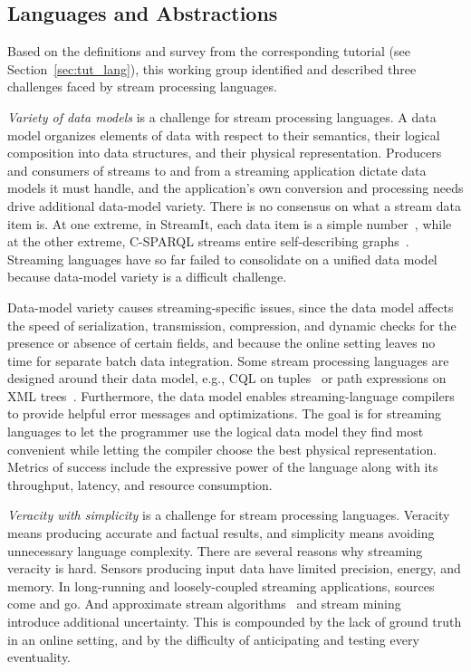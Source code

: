 \subsection{Languages and Abstractions}\label{sec:wg_lang}

Based on the definitions and survey from the corresponding tutorial
(see Section~\ref{sec:tut_lang}), this working group identified and
described three challenges faced by stream processing languages.

\emph{Variety of data models} is a challenge for stream processing
languages. A data model organizes elements of data with respect to
their semantics, their logical composition into data structures, and
their physical representation. Producers and consumers of streams to
and from a streaming application dictate data models it must handle,
and the application's own conversion and processing needs drive
additional data-model variety.  There is no consensus on what a stream
data item is. At one extreme, in \textsf{StreamIt}, each data item is a simple
number~\cite{thies_et_al_2002}, while at the other extreme, \textsf{C-SPARQL}
streams entire self-describing graphs~\cite{barbieri_et_al_2009}.
Streaming languages have so far failed to consolidate on a unified data model
because data-model variety is a difficult challenge.

Data-model variety causes streaming-specific issues, since the data
model affects the speed of serialization, transmission, compression,
and dynamic checks for the presence or absence of certain fields, and
because the online setting leaves no time for separate batch data
integration. Some stream processing languages are designed around
their data model, e.g., CQL on tuples~\cite{arasu_babu_widom_2006} or
path expressions on XML trees~\cite{diao_et_al_2002}. Furthermore, the
data model enables streaming-language compilers to provide helpful
error messages and optimizations. The goal is for streaming languages to let the programmer use the
logical data model they find most convenient while letting the
compiler choose the best physical representation. Metrics of success
include the expressive power of the language along with its throughput,
latency, and resource consumption.

\emph{Veracity with simplicity} is a challenge for stream processing
languages. Veracity means producing accurate and factual results, and
simplicity means avoiding unnecessary language complexity. There are
several reasons why streaming veracity is hard. Sensors producing
input data have limited precision, energy, and memory. In
long-running and loosely-coupled streaming applications,
sources come and go. And approximate stream
algorithms~\cite{babcock_et_al_2002} and stream
mining~\cite{gaber_zaslavsky_krishnaswamy_2005} introduce additional
uncertainty. This is compounded by the lack of ground truth in an
online setting, and by the difficulty of anticipating and testing
every eventuality.

